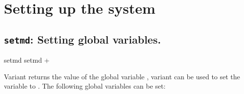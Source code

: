 \chapter{Setting up the system}
\label{chap:setup}

\section{\texttt{setmd}: Setting global variables.}

\begin{essyntax}
 setmd 
 setmd  +
\end{essyntax}

Variant  returns the value of the \es global variable
, variant  can be used to set the variable
 to . The following global variables can be
set:

\newenvironment{globvar}{
  \begin{list}{}{
      \setlength{\rightmargin}{1em}
      \setlength{\leftmargin}{2em}
      \setlength{\partopsep}{0pt}
      \setlength{\topsep}{1ex}
      \setlength{\parsep}{0.5ex}
      \setlength{\listparindent}{-1em}
      \setlength{\labelwidth}{0.5em}
      \setlength{\labelsep}{0.5em}
      \renewcommand{\makelabel}[1]{%
        \index{##1@\texttt{##1} (global variable)|mainindex}%
        \index{global variables!\texttt{##1}|mainindex}%
        \texttt{##1}%
      }
    }
  }{
  \end{list}
}
\newcommand{\ro}{\emph{read-only}}

